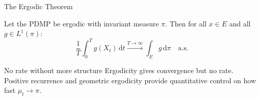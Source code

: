 \documentclass[aspectratio=169]{beamer}
\begin{document}
\begin{frame}{The Ergodic Theorem}

  \begin{theorem}
    Let the PDMP be ergodic with invariant measure $\pi$. Then for
    all $x \in E$ and all $g \in L^1(\pi)$:
    \[
      \frac{1}{T}\int_0^T g(X_t)\,\mathrm{d}t
      \xrightarrow{T\to\infty} \int_E g\,\mathrm{d}\pi \quad \text{a.s.}
    \]
  \end{theorem}


  \bigskip
  \begin{alertblock}{No rate without more structure}
    Ergodicity gives convergence but no rate. Positive recurrence
    and geometric ergodicity provide quantitative control on how
    fast $\mu_t \to \pi$.
  \end{alertblock}

\end{frame}
\end{document}
